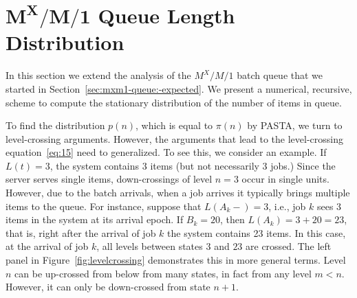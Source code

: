 \section
[$M^X/M/1$ Queue Length Distribution]
{$\mathbf{M^X/M/1}$ Queue Length Distribution}
\label{sec:batch-arrivals}

In this section we extend the analysis of the $M^X/M/1$ batch queue
that we started in Section~\ref{sec:mxm1-queue:-expected}.  We present
a numerical, recursive, scheme to compute the stationary distribution
of the number of items in queue. 

To find the distribution $p(n)$, which is equal to $\pi(n)$ by PASTA,
we turn to level-crossing arguments. However, the arguments that lead
to the level-crossing equation~\eqref{eq:15} need to generalized.  To
see this, we consider an example.  If $L(t)=3$, the system contains
$3$ items (but not necessarily $3$ jobs.)  Since the server serves
single items, down-crossings of level $n=3$ occur in single
units. However, due to the batch arrivals, when a job arrives it
typically brings multiple items to the queue. For instance, suppose
that $L(A_k-) = 3$, i.e., job $k$ sees 3 items in the system at its
arrival epoch.  If $B_k = 20$, then $L(A_k)=3+20=23$, that is, right
after the arrival of job $k$ the system contains 23 items. In this
case, at the arrival of job $k$, all levels between states $3$ and
$23$ are crossed.  The left panel in Figure~\ref{fig:levelcrossing}
demonstrates this in more general terms.  Level $n$ can be up-crossed
from below from many states, in fact from any level $m <n$. However,
it can only be down-crossed from state $n+1$.



